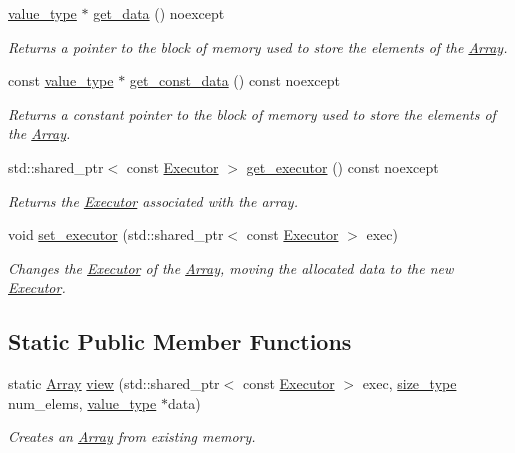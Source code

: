 \begin{DoxyCompactItemize}
\hyperlink{classgko_1_1Array_ad40c95e429262175cae51bcabd291a5b}{value\+\_\+type} $\ast$ \hyperlink{classgko_1_1Array_a9acf29878703bb8767e3cea2ba499dae}{get\+\_\+data} () noexcept
\begin{DoxyCompactList}\small\item\em Returns a pointer to the block of memory used to store the elements of the \hyperlink{classgko_1_1Array}{Array}. \end{DoxyCompactList}\item 
const \hyperlink{classgko_1_1Array_ad40c95e429262175cae51bcabd291a5b}{value\+\_\+type} $\ast$ \hyperlink{classgko_1_1Array_a5a46e0920b649cdb062f5e415922d1aa}{get\+\_\+const\+\_\+data} () const noexcept
\begin{DoxyCompactList}\small\item\em Returns a constant pointer to the block of memory used to store the elements of the \hyperlink{classgko_1_1Array}{Array}. \end{DoxyCompactList}\item 
std\+::shared\+\_\+ptr$<$ const \hyperlink{classgko_1_1Executor}{Executor} $>$ \hyperlink{classgko_1_1Array_a820e5930cb5072acc7673fdb2d11efcd}{get\+\_\+executor} () const noexcept
\begin{DoxyCompactList}\small\item\em Returns the \hyperlink{classgko_1_1Executor}{Executor} associated with the array. \end{DoxyCompactList}\item 
void \hyperlink{classgko_1_1Array_a44dd24e909f518f08320c3065e087d85}{set\+\_\+executor} (std\+::shared\+\_\+ptr$<$ const \hyperlink{classgko_1_1Executor}{Executor} $>$ exec)
\begin{DoxyCompactList}\small\item\em Changes the \hyperlink{classgko_1_1Executor}{Executor} of the \hyperlink{classgko_1_1Array}{Array}, moving the allocated data to the new \hyperlink{classgko_1_1Executor}{Executor}. \end{DoxyCompactList}\end{DoxyCompactItemize}
\subsection*{Static Public Member Functions}
\begin{DoxyCompactItemize}
\item 
static \hyperlink{classgko_1_1Array}{Array} \hyperlink{classgko_1_1Array_ae8e2b4841e60741227daf3367de6ecde}{view} (std\+::shared\+\_\+ptr$<$ const \hyperlink{classgko_1_1Executor}{Executor} $>$ exec, \hyperlink{namespacegko_a6e5c95df0ae4e47aab2f604a22d98ee7}{size\+\_\+type} num\+\_\+elems, \hyperlink{classgko_1_1Array_ad40c95e429262175cae51bcabd291a5b}{value\+\_\+type} $\ast$data)
\begin{DoxyCompactList}\small\item\em Creates an \hyperlink{classgko_1_1Array}{Array} from existing memory. \end{DoxyCompactList}\end{DoxyCompactItemize}


